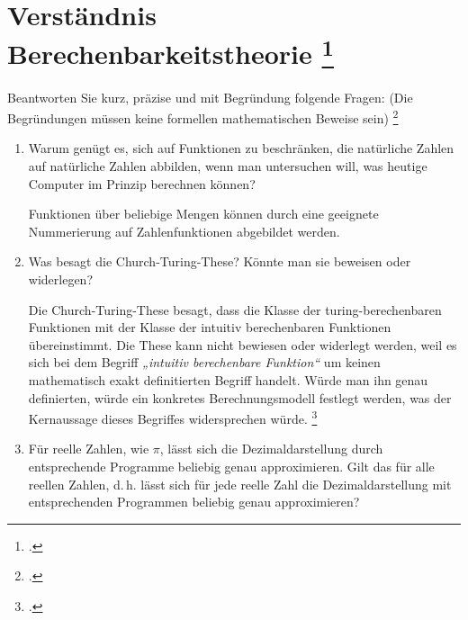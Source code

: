 \documentclass{lehramt-informatik-aufgabe}
\begin{document}
\section{Verständnis Berechenbarkeitstheorie
\footcite{66115:2016:03}}

Beantworten Sie kurz, präzise und mit Begründung folgende Fragen: (Die
Begründungen müssen keine formellen mathematischen Beweise sein)
\footcite[Aufgabe 9: F2016T2A2 (Check-Up)]{theo:ab:4}

\begin{enumerate}


\item Warum genügt es, sich auf Funktionen zu beschränken, die
natürliche Zahlen auf natürliche Zahlen abbilden, wenn man untersuchen
will, was heutige Computer im Prinzip berechnen können?

\begin{liAntwort}
Funktionen über beliebige Mengen können durch eine geeignete
Nummerierung auf Zahlenfunktionen abgebildet werden.
\end{liAntwort}


\item Was besagt die Church-Turing-These? Könnte man sie beweisen oder
widerlegen?

\begin{liAntwort}
Die Church-Turing-These besagt, dass die Klasse der turing-berechen\-baren
Funktionen mit der Klasse der intuitiv berechenbaren Funktionen
übereinstimmt. Die These kann nicht bewiesen oder widerlegt werden, weil
es sich bei dem Begriff \emph{„intuitiv berechenbare Funktion“} um
keinen mathematisch exakt definitierten Begriff handelt. Würde man ihn
genau definierten, würde ein konkretes Berechnungsmodell festlegt
werden, was der Kernaussage dieses Begriffes widersprechen würde.
\footcite[Seite 308, These 6.1]{hoffmann}
\end{liAntwort}


\item Für reelle Zahlen, wie \zB $\pi$, lässt sich die
Dezimaldarstellung durch entsprechende Programme beliebig genau
approximieren. Gilt das für alle reellen Zahlen, d.\,h. lässt sich für
jede reelle Zahl die Dezimaldarstellung mit entsprechenden Programmen
beliebig genau approximieren?


\end{enumerate}
\end{document}
